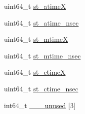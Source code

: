 \begin{DoxyCompactItemize}
uint64\_\-t \hyperlink{structLinux_1_1tgt__stat64_a6602fcfc6e3137ac04ca7a50efbc3d34}{st\_\-atimeX}
\item 
uint64\_\-t \hyperlink{structLinux_1_1tgt__stat64_acb7200d0409f0e23d437284ac855e601}{st\_\-atime\_\-nsec}
\item 
uint64\_\-t \hyperlink{structLinux_1_1tgt__stat64_ab8b373ea7421a08973572a52f534c7f7}{st\_\-mtimeX}
\item 
uint64\_\-t \hyperlink{structLinux_1_1tgt__stat64_a04f665a5a40d0b9b0317a59776088931}{st\_\-mtime\_\-nsec}
\item 
uint64\_\-t \hyperlink{structLinux_1_1tgt__stat64_a00568e9305d84f1177fcf07f6a5e28e4}{st\_\-ctimeX}
\item 
uint64\_\-t \hyperlink{structLinux_1_1tgt__stat64_a0d5e7bb39a902e0e50961163ac064ef4}{st\_\-ctime\_\-nsec}
\item 
int64\_\-t \hyperlink{structLinux_1_1tgt__stat64_a851e0f04d59998d6361240f719559e87}{\_\-\_\-\_\-unused} \mbox{[}3\mbox{]}
\end{DoxyCompactItemize}


